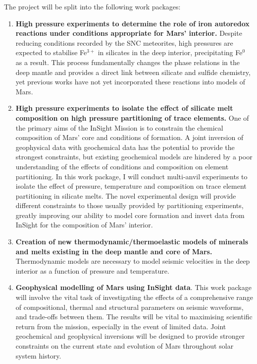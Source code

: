 \documentclass[11pt,twoside,a4paper]{article}
\begin{document}
The project will be split into the following work packages:
\begin{enumerate}
\item \textbf{High pressure experiments to determine the role of iron autoredox reactions under conditions appropriate for Mars' interior.} Despite reducing conditions recorded by the SNC meteorites, high pressures are expected to stabilise Fe$^{3+}$ in silicates in the deep interior, precipitating Fe$^0$ as a result. This process fundamentally changes the phase relations in the deep mantle and provides a direct link between silicate and sulfide chemistry, yet previous works have not yet incorporated these reactions into models of Mars.
\item \textbf{High pressure experiments to isolate the effect of silicate melt composition on high pressure partitioning of trace elements.} One of the primary aims of the InSight Mission is to constrain the chemical composition of Mars' core and conditions of formation. A joint inversion of geophysical data with geochemical data has the potential to provide the strongest constraints, but existing geochemical models are hindered by a poor understanding of the effects of conditions and composition on element partitioning. In this work package, I will conduct multi-anvil experiments to isolate the effect of pressure, temperature and composition on trace element partitioning in silicate melts. The novel experimental design will provide different constraints to those usually provided by partitioning experiments, greatly improving our ability to model core formation and invert data from InSight for the composition of Mars' interior.
\item \textbf{Creation of new thermodynamic/thermoelastic models of minerals and melts existing in the deep mantle and core of Mars.} Thermodynamic models are necessary to model seismic velocities in the deep interior as a function of pressure and temperature. 
\item \textbf{Geophysical modelling of Mars using InSight data}. This work package will involve the vital task of investigating the effects of a comprehensive range of compositional, thermal and structural parameters on seismic waveforms, and trade-offs between them. The results will be vital to maximising scientific return from the mission, especially in the event of limited data. Joint geochemical and geophysical inversions will be designed to provide stronger constraints on the current state and evolution of Mars throughout solar system history.
\end{enumerate}
\end{document}
